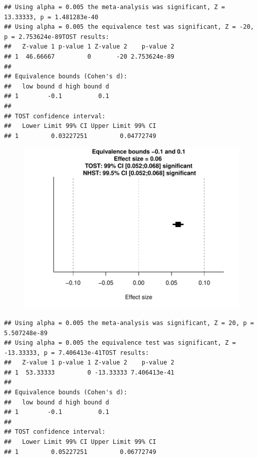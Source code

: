 \documentclass[english,man]{apa6}
\theoremstyle{definition}
\theoremstyle{definition}
\theoremstyle{definition}
\theoremstyle{remark}
\begin{document}
\begin{verbatim}
## Using alpha = 0.005 the meta-analysis was significant, Z = 13.33333, p = 1.481283e-40
## Using alpha = 0.005 the equivalence test was significant, Z = -20, p = 2.753624e-89TOST results:
##   Z-value 1 p-value 1 Z-value 2    p-value 2
## 1  46.66667         0       -20 2.753624e-89
## 
## Equivalence bounds (Cohen's d):
##   low bound d high bound d
## 1        -0.1          0.1
## 
## TOST confidence interval:
##   Lower Limit 99% CI Upper Limit 99% CI
## 1         0.03227251         0.04772749
\end{verbatim}

\begin{figure}[htbp]
\centering
\includegraphics{manuscript_files/figure-latex/unnamed-chunk-7-7.pdf}
\caption{}
\end{figure}

\begin{verbatim}
## Using alpha = 0.005 the meta-analysis was significant, Z = 20, p = 5.507248e-89
## Using alpha = 0.005 the equivalence test was significant, Z = -13.33333, p = 7.406413e-41TOST results:
##   Z-value 1 p-value 1 Z-value 2    p-value 2
## 1  53.33333         0 -13.33333 7.406413e-41
## 
## Equivalence bounds (Cohen's d):
##   low bound d high bound d
## 1        -0.1          0.1
## 
## TOST confidence interval:
##   Lower Limit 99% CI Upper Limit 99% CI
## 1         0.05227251         0.06772749
\end{verbatim}
\end{document}
